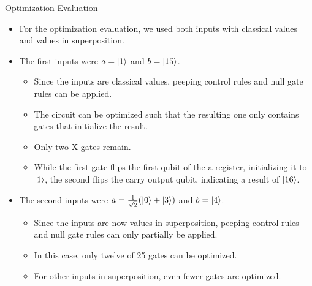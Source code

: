 \begin{frame}{Optimization Evaluation}
    \begin{itemize}
        \item For the optimization evaluation, we used both inputs with classical values and values in superposition.
        \item The first inputs were $a = \ket{1}$ and $b = \ket{15}$.
        \begin{itemize}
            \item Since the inputs are classical values, peeping control rules and null gate rules can be applied.
            \item The circuit can be optimized such that the resulting one only contains gates that initialize the result.
            \item Only two X gates remain. 
            \item While the first gate flips the first qubit of the a register, initializing it to $\ket{1}$, the second flips the carry output qubit, indicating a result of $\ket{16}$.
        \end{itemize}
        \item The second inputs were $a = \frac{1}{\sqrt{2}} (\ket{0} + \ket{3})$ and $b = \ket{4}$.
        \begin{itemize}
            \item Since the inputs are now values in superposition, peeping control rules and null gate rules can only partially be applied.
            \item In this case, only twelve of 25 gates can be optimized.
            \item For other inputs in superposition, even fewer gates are optimized.
        \end{itemize}
    \end{itemize}
\end{frame}

